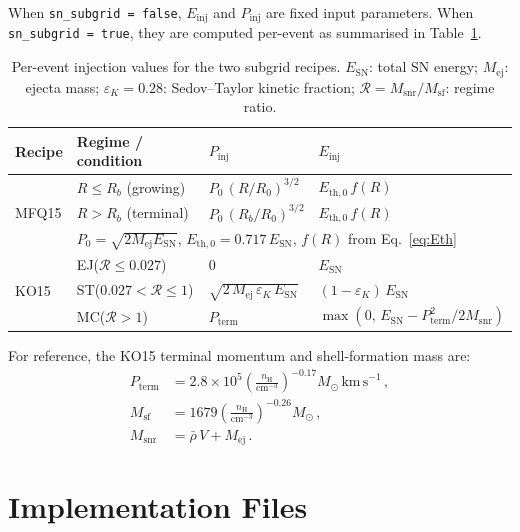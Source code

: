 \documentclass[11pt]{article}
\begin{document}
When \texttt{sn\_subgrid = false}, $E_\mathrm{inj}$ and $P_\mathrm{inj}$ are
fixed input parameters.  When \texttt{sn\_subgrid = true}, they are computed
per-event as summarised in Table~\ref{tab:recipes}.

\begin{table}[h]
\centering
\caption{Per-event injection values for the two subgrid recipes.
  $E_\mathrm{SN}$: total SN energy;
  $M_\mathrm{ej}$: ejecta mass;
  $\varepsilon_K = 0.28$: Sedov--Taylor kinetic fraction;
  $\mathcal{R} = M_\mathrm{snr}/M_\mathrm{sf}$: regime ratio.}
\label{tab:recipes}
\begin{tabular}{@{}llll@{}}
\toprule
Recipe & Regime / condition & $P_\mathrm{inj}$ & $E_\mathrm{inj}$ \\
\midrule
\multirow{3}{*}{MFQ15}
  & $R \leq R_b$ (growing)
    & $P_0\,(R/R_0)^{3/2}$
    & $E_\mathrm{th,0}\,f(R)$ \\
  & $R > R_b$ (terminal)
    & $P_0\,(R_b/R_0)^{3/2}$
    & $E_\mathrm{th,0}\,f(R)$ \\
  & \multicolumn{3}{l}{$P_0 = \sqrt{2M_\mathrm{ej}E_\mathrm{SN}}$,\;
    $E_\mathrm{th,0} = 0.717\,E_\mathrm{SN}$,\;
    $f(R)$ from Eq.~\eqref{eq:Eth}} \\[6pt]
\multirow{3}{*}{KO15}
  & EJ\;($\mathcal{R} \leq 0.027$)
    & $0$
    & $E_\mathrm{SN}$ \\
  & ST\;($0.027 < \mathcal{R} \leq 1$)
    & $\sqrt{2\,M_\mathrm{ej}\,\varepsilon_K\,E_\mathrm{SN}}$
    & $(1-\varepsilon_K)\,E_\mathrm{SN}$ \\
  & MC\;($\mathcal{R} > 1$)
    & $P_\mathrm{term}$
    & $\max(0,\,E_\mathrm{SN} - P_\mathrm{term}^2/2M_\mathrm{snr})$ \\
\bottomrule
\end{tabular}
\end{table}

\noindent
For reference, the KO15 terminal momentum and shell-formation mass are:
\begin{align}
  P_\mathrm{term} &= 2.8\times10^5
    \left(\frac{n_\mathrm{H}}{\mathrm{cm}^{-3}}\right)^{-0.17}
    M_\odot\,\mathrm{km\,s}^{-1}\,, \\
  M_\mathrm{sf}   &= 1679
    \left(\frac{n_\mathrm{H}}{\mathrm{cm}^{-3}}\right)^{-0.26}
    M_\odot\,, \\
  M_\mathrm{snr}  &= \bar{\rho}\,V + M_\mathrm{ej}\,.
\end{align}

\section{Implementation Files}
\end{document}
